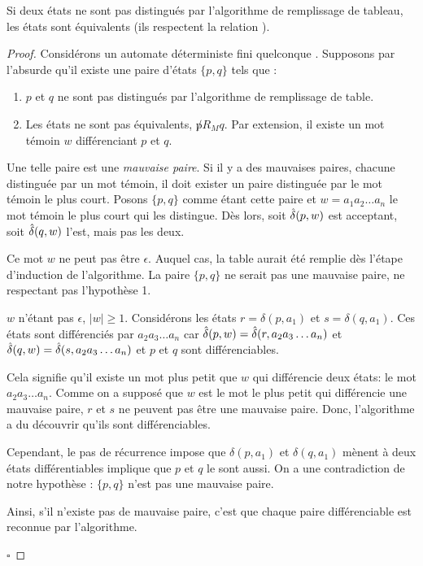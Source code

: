 	 \begin{theorem}
	 	Si deux états ne sont pas distingués par l'algorithme de remplissage de tableau, les états sont équivalents (ils respectent la relation \rm).
	 \end{theorem}
	 
	 \begin{proof}
	 	
	 Considérons un automate déterministe fini quelconque \automaton. Supposons par l'absurde qu'il existe une paire d'états $\{p,q\}$ tels que :
	 \begin{enumerate}
	 		\item $p$ et $q$ ne sont pas distingués par l'algorithme de remplissage de table.
	 		\item Les états ne sont pas équivalents, $\not pR_M q$. Par extension, il existe un mot témoin $w$ différenciant $p$ et $q$.
	 \end{enumerate}
	 	
	 Une telle paire est une \emph{mauvaise paire}. Si il y a des mauvaises paires, chacune distinguée par un mot témoin, il doit exister un paire distinguée par le mot témoin le plus court. Posons $\{p,q\}$ comme étant cette paire et $w=a_1a_2\dots a_n$ le mot témoin le plus court qui les distingue. Dès lors, soit $\hat{\delta}(p,w)$ est acceptant, soit $\hat{\delta}(q,w)$ l'est, mais pas les deux.
	 	
	 Ce mot $w$ ne peut pas être $\epsilon$. Auquel cas, la table aurait été remplie dès l'étape d'induction de l'algorithme. La paire $\{p,q\}$ ne serait pas une mauvaise paire, ne respectant pas l'hypothèse 1.
	 
	 $w$ n'étant pas $\epsilon$, $ |w| \ge 1$. Considérons les états $r = \delta(p,a_1)$ et $s=\delta(q,a_1)$. Ces états sont différenciés par $a_2a_3\dots a_n$ car $\hat{\delta}(p,w) = \hat{\delta}(r, a_2a_3\dots a_n)$ et $\hat{\delta}(q,w) = \hat{\delta}(s, a_2a_3\dots a_n)$ et $p$ et $q$ sont différenciables.
	 
	 Cela signifie qu'il existe un mot plus petit que $w$ qui différencie deux états: le mot $a_2a_3\dots a_n$. Comme on a supposé que $w$ est le mot le plus petit qui différencie une mauvaise paire, $r$ et $s$ ne peuvent pas être une mauvaise paire. Donc, l'algorithme a du découvrir qu'ils sont différenciables.
	 	
	 Cependant, le pas de récurrence impose que $\delta(p, a_1)$ et $\delta(q, a_1)$ mènent à deux états différentiables implique que $p$ et $q$ le sont aussi. On a une contradiction de notre hypothèse : $\{p,q\}$ n'est pas une mauvaise paire.
	 
	 Ainsi, s'il n'existe pas de mauvaise paire, c'est que chaque paire différenciable est reconnue par l'algorithme.
	 
	 \hfill$\square$
	 \end{proof}
	 
